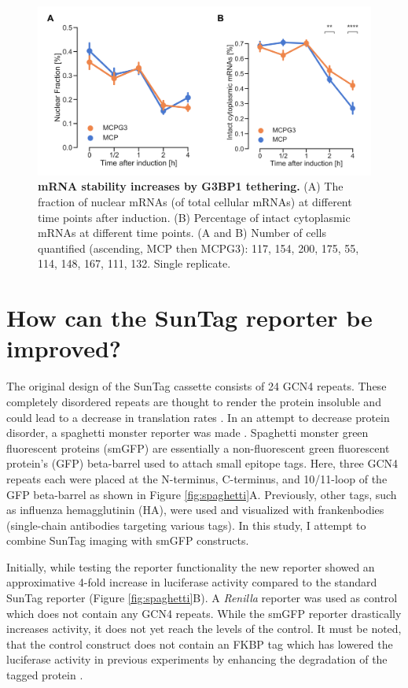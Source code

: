 \begin{figure}[h]
    \centering
    \includegraphics[width=\linewidth]{images/figure5}
    \caption{\textbf{mRNA stability increases by G3BP1 tethering.}
        (A) The fraction of nuclear mRNAs (of total cellular mRNAs)
            at different time points after induction.
        (B) Percentage of intact cytoplasmic mRNAs at different time points.
        (A and B) Number of cells quantified (ascending, MCP then MCPG3):
            117, 154, 200, 175, 55, 114, 148, 167, 111, 132. Single replicate.
    }
    \label{fig:mcp_treat}
\end{figure}


\section{How can the SunTag reporter be improved?} \label{spaghetti}

The original design of the SunTag cassette consists of 24 GCN4 repeats.
These completely disordered repeats are thought to render the protein insoluble and could lead to a decrease in translation rates \cite{gurry_order_2015}.
In an attempt to decrease protein disorder, a spaghetti monster reporter was made \cite{zhao_genetically_2019}.
Spaghetti monster green fluorescent proteins (smGFP) are essentially a non-fluorescent green fluorescent protein's (GFP) beta-barrel used to attach small epitope tags.
Here, three GCN4 repeats each were placed at the N-terminus, C-terminus, and 10/11-loop of the GFP beta-barrel as shown in Figure \ref{fig:spaghetti}A.
Previously, other tags, such as influenza hemagglutinin (HA), were used and visualized with frankenbodies (single-chain antibodies targeting various tags).
In this study, I attempt to combine SunTag imaging with smGFP constructs.

Initially, while testing the reporter functionality the new reporter showed an approximative 4-fold increase in luciferase activity compared to the standard SunTag reporter (Figure \ref{fig:spaghetti}B).
A \textit{Renilla} reporter was used as control which does not contain any GCN4 repeats.
While the smGFP reporter drastically increases activity, it does not yet reach the levels of the control.
It must be noted, that the control construct does not contain an FKBP tag which has lowered the luciferase activity in previous experiments by enhancing the degradation of the tagged protein \cite{bonger_small_2011}.

